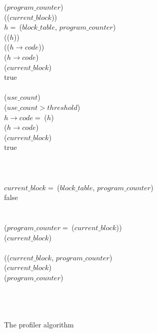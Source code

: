 \begin{figure}

\begin{tabbing}
 ($program\_counter$)\\
\startblk
   (($current\_block$))\\
  \startblk
    $h =\ $($block\_table$, $program\_counter$)\\
     (($h$))\\
    \startblk
       (($h \rightarrow code$))\\
      \startblk
        ($h \rightarrow code$)\\
        ($current\_block$)\\
         true\\
      \stopblk
      \\
      \startblk
        ($use\_count$)\\
         ($use\_count > threshold$)\\
        \startblk
          $h \rightarrow code =\ $($h$)\\
          ($h \rightarrow code$)\\
          ($current\_block$)\\
           true\\
        \stopblk
        \\
      \stopblk
      \\
    \stopblk
    \\
    \startblk
      $current\_block =\ $($block\_table$, $program\_counter$)\\
       false\\
    \stopblk
    \\
  \stopblk
  \\
   ($program\_counter =\ $($current\_block$))\\
  \startblk
    ($current\_block$)\\
  \stopblk
  \\
  \startblk
     (($current\_block$, $program\_counter$)\\
    \startblk
      ($current\_block$)\\
       ($program\_counter$)\\
    \stopblk
    \\
  \stopblk
  \\
\stopblk
{}\\
\end{tabbing}

\caption{\label{profalg}The profiler algorithm}
\end{figure}

